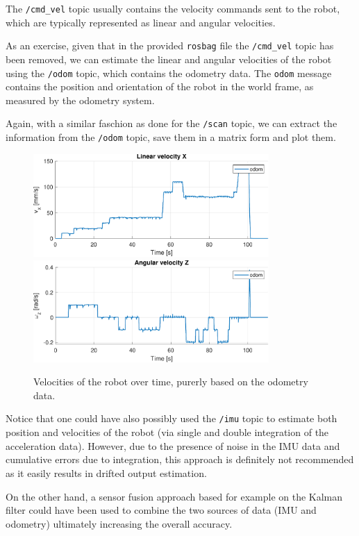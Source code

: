 The \texttt{/cmd\_vel} topic usually contains the velocity commands sent to the robot, which are typically represented as linear and angular velocities.

As an exercise, given that in the provided \texttt{rosbag} file the \texttt{/cmd\_vel} topic has been removed, we can estimate the linear and angular velocities of the robot using the \texttt{/odom} topic, which contains the odometry data.
The \texttt{odom} message contains the position and orientation of the robot in the world frame, as measured by the odometry system.

Again, with a similar faschion as done for the \texttt{/scan} topic, we can extract the information from the \texttt{/odom} topic, save them in a matrix form and plot them.

\begin{figure}[H]
    \centering
    \includegraphics[width=0.8\textwidth]{./img/MATLAB/linear_velocity.pdf}
    \vspace{9pt}
    \includegraphics[width=0.8\textwidth]{./img/MATLAB/angular_velocity.pdf}
    \caption{Velocities of the robot over time, purerly based on the odometry data.}
    \label{fig:odom_velocities}
\end{figure}

Notice that one could have also possibly used the \texttt{/imu} topic to estimate both position and velocities of the robot (via single and double integration of the acceleration data).
However, due to the presence of noise in the IMU data and cumulative errors due to integration, this approach is definitely not recommended as it easily results in drifted output estimation.

On the other hand, a sensor fusion approach based for example on the Kalman filter could have been used to combine the two sources of data (IMU and odometry) ultimately increasing the overall accuracy.

